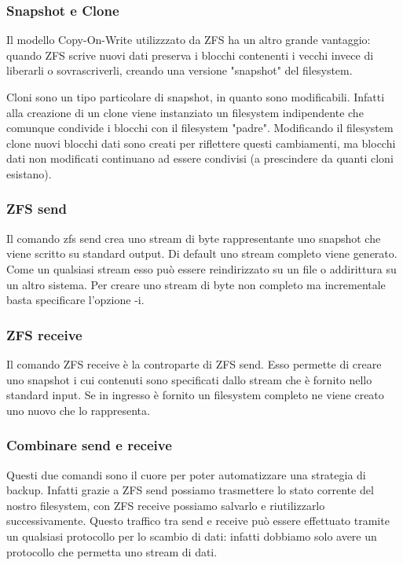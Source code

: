 \documentclass{beamer}
\begin{document}
\begin{frame}
\frametitle{Snapshot e Clone}
Il modello Copy-On-Write utilizzzato da ZFS ha un altro grande vantaggio: quando ZFS scrive nuovi dati preserva i blocchi contenenti i vecchi invece di liberarli o sovrascriverli, creando una versione "snapshot" del filesystem.
\end{frame}

\begin{frame}
Cloni sono un tipo particolare di snapshot, in quanto sono modificabili. Infatti alla creazione di un clone viene instanziato un filesystem indipendente che comunque condivide i blocchi con il filesystem "padre". Modificando il filesystem clone nuovi blocchi dati sono creati per riflettere questi cambiamenti, ma blocchi dati non modificati continuano ad essere condivisi (a prescindere da quanti cloni esistano).
\end{frame}

\begin{frame}
\frametitle{ZFS send}
Il comando zfs send crea uno stream di byte rappresentante uno snapshot che viene scritto su standard output. Di default uno stream completo viene generato. Come un qualsiasi stream esso pu\`o essere reindirizzato su un file o addirittura su un altro sistema.
\newline
Per creare uno stream di byte non completo ma incrementale basta specificare l'opzione -i.
\end{frame}

\begin{frame}
\frametitle{ZFS receive}
Il comando ZFS receive \`e la controparte di ZFS send. Esso permette di creare uno snapshot i cui contenuti sono specificati dallo stream che \`e fornito nello standard input. Se in ingresso \`e fornito un filesystem completo ne viene creato uno nuovo che lo rappresenta.
\end{frame}

\begin{frame}
\frametitle{Combinare send e receive}
Questi due comandi sono il cuore per poter automatizzare una strategia di backup. Infatti grazie a ZFS send possiamo trasmettere lo stato corrente del nostro filesystem, con ZFS receive possiamo salvarlo e riutilizzarlo successivamente.
\newline
Questo traffico tra send e receive pu\`o essere effettuato tramite un qualsiasi protocollo per lo scambio di dati: infatti dobbiamo solo avere un protocollo che permetta uno stream di dati.
\end{frame}
\end{document}
